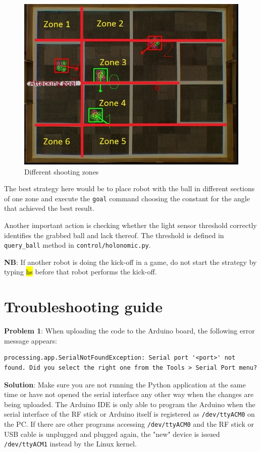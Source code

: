 \documentclass[a4paper,12pt]{article}
\newcommand{\hg}[1]{\hl{\ttfamily #1}}
\begin{document}
\begin{figure}
\centering
\includegraphics[scale=.4]{zones.jpg}
\caption{Different shooting zones}
\label{fig:zones}
\end{figure} 

The best strategy here would be to place robot with the ball in different sections of one zone and execute the \texttt{goal} command choosing the constant for the angle that achieved the best result.

Another important action is checking whether the light sensor threshold correctly identifies the grabbed ball and lack thereof. The threshold is defined in \texttt{query\_ball} method in \texttt{control/holonomic.py}.

\textbf{NB}: If another robot is doing the kick-off in a game, do not start the strategy by typing \hg{hs} before that robot performs the kick-off.

\section{Troubleshooting guide}

\textbf{Problem 1}: When uploading the code to the Arduino board, the following error message appears:
\begin{lstlisting}
processing.app.SerialNotFoundException: Serial port '<port>' not found. Did you select the right one from the Tools > Serial Port menu?
\end{lstlisting}
\textbf{Solution}: Make sure you are not running the Python application at the same time or have not opened the serial interface any other way when the changes are being uploaded. The Arduino IDE is only able to program the Arduino when the serial interface of the RF stick or Arduino itself is registered as \texttt{/dev/ttyACM0} on the PC. If there are other programs accessing \texttt{/dev/ttyACM0} and the RF stick or USB cable is unplugged and plugged again, the "new" device is issued \texttt{/dev/ttyACM1} instead by the Linux kernel.
\end{document}
